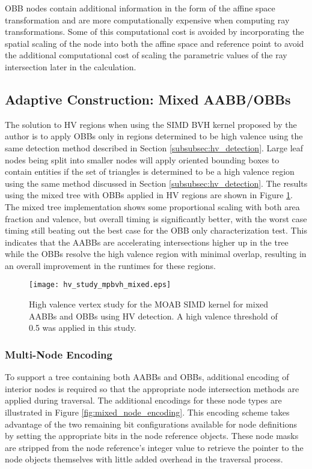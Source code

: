 OBB nodes contain additional information in the form of the affine space
transformation and are more computationally expensive when computing ray
transformations. Some of this computational cost is avoided by incorporating the
spatial scaling of the node into both the affine space and reference point to
avoid the additional computational cost of scaling the parametric values of the
ray intersection later in the calculation.

\subsection{Adaptive Construction: Mixed AABB/OBBs}

The solution to HV regions when using the SIMD BVH kernel proposed by the author
is to apply OBBs only in regions determined to be high valence using the same
detection method described in Section \ref{subsubsec:hv_detection}. Large leaf
nodes being split into smaller nodes will apply oriented bounding boxes to
contain entities if the set of triangles is determined to be a high valence
region using the same method discussed in Section \ref{subsubsec:hv_detection}.
The results using the mixed tree with OBBs applied in HV regions are shown in
Figure \ref{fig:hv_study_mpbvh_mixed}. The mixed tree implementation shows some
proportional scaling with both area fraction and valence, but overall timing
is significantly better, with the worst case timing still beating out the best
case for the OBB only characterization test. This indicates that the AABBs are
accelerating intersections higher up in the tree while the OBBs resolve the high
valence region with minimal overlap, resulting in an overall improvement in the
runtimes for these regions.

\begin{figure}[H]
  \centering
  \texttt{[image: hv\_study\_mpbvh\_mixed.eps]}
  \caption{High valence vertex study for the MOAB SIMD kernel for mixed AABBs
    and OBBs using HV detection. A high valence threshold of 0.5 was applied in
    this study.}
  \label{fig:hv_study_mpbvh_mixed}
\end{figure}

\subsubsection{Multi-Node Encoding}

To support a tree containing both AABBs and OBBs, additional encoding of
interior nodes is required so that the appropriate node intersection methods are
applied during traversal. The additional encodings for these node types are
illustrated in Figure \ref{fig:mixed_node_encoding}. This encoding scheme takes
advantage of the two remaining bit configurations available for node definitions
by setting the appropriate bits in the node reference objects. These node masks
are stripped from the node reference's integer value to retrieve the pointer to
the node objects themselves with little added overhead in the traversal process.

